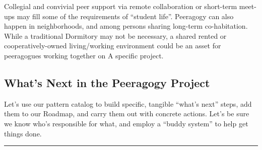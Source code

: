 Collegial and convivial peer support via remote collaboration or
short-term meet-ups may fill some of the requirements of ``student
life''. Peeragogy can also happen in neighborhoods, and among persons
sharing long-term co-habitation. While a traditional Dormitory may not
be necessary, a shared rented or cooperatively-owned living/working
environment could be an asset for peeragogues working together on {{A
specific project}}.

\hypertarget{whats-next-in-the-peeragogy-project}{%
\subsection{What's Next in the Peeragogy
Project}\label{whats-next-in-the-peeragogy-project}}

Let's use our pattern catalog to build specific, tangible ``what's
next'' steps, add them to our {{Roadmap}}, and carry them out with
concrete actions. Let's be sure we know who's responsible for what, and
employ a ``buddy system'' to help get things done.

\begin{center}\rule{0.5\linewidth}{0.5pt}\end{center}
